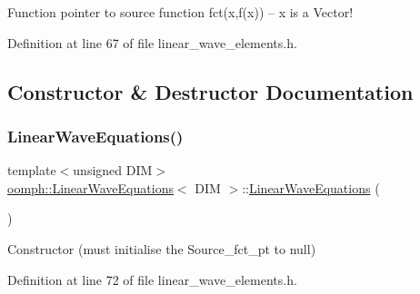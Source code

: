 Function pointer to source function fct(x,f(x)) -- x is a Vector! 



Definition at line 67 of file linear\+\_\+wave\+\_\+elements.\+h.



\subsection{Constructor \& Destructor Documentation}
\mbox{\label{classoomph_1_1LinearWaveEquations_a3c434f9aef855a40403b74127fb36984}} 
\subsubsection{\texorpdfstring{Linear\+Wave\+Equations()}{LinearWaveEquations()}\hspace{0.1cm}{\footnotesize\ttfamily [1/2]}}
{\footnotesize\ttfamily template$<$unsigned D\+IM$>$ \\
\hyperlink{classoomph_1_1LinearWaveEquations}{oomph\+::\+Linear\+Wave\+Equations}$<$ D\+IM $>$\+::\hyperlink{classoomph_1_1LinearWaveEquations}{Linear\+Wave\+Equations} (\begin{DoxyParamCaption}{ }\end{DoxyParamCaption})\hspace{0.3cm}{\ttfamily [inline]}}



Constructor (must initialise the Source\+\_\+fct\+\_\+pt to null) 



Definition at line 72 of file linear\+\_\+wave\+\_\+elements.\+h.

\mbox{\label{classoomph_1_1LinearWaveEquations_a611ab736d3b90455327c5a2812f8fbf0}} 
